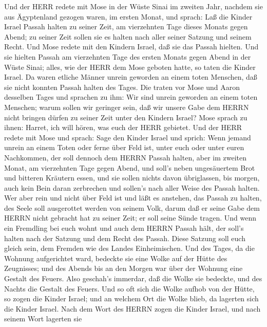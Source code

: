  Und der HERR redete mit Mose in der Wüste Sinai im zweiten
Jahr, nachdem sie aus Ägyptenland gezogen waren, im ersten Monat, und
sprach:  Laß die Kinder Israel Passah halten zu seiner Zeit,
 am vierzehnten Tage dieses Monats gegen Abend; zu seiner
Zeit sollen sie es halten nach aller seiner Satzung und seinem Recht.
 Und Mose redete mit den Kindern Israel, daß sie das Passah
hielten.  Und sie hielten Passah am vierzehnten Tage des
ersten Monats gegen Abend in der Wüste Sinai; alles, wie der HERR dem
Mose geboten hatte, so taten die Kinder Israel.  Da waren
etliche Männer unrein geworden an einem toten Menschen, daß sie nicht
konnten Passah halten des Tages. Die traten vor Mose und Aaron desselben
Tages  und sprachen zu ihm: Wir sind unrein geworden an
einem toten Menschen; warum sollen wir geringer sein, daß wir unsere
Gabe dem HERRN nicht bringen dürfen zu seiner Zeit unter den Kindern
Israel?  Mose sprach zu ihnen: Harret, ich will hören, was
euch der HERR gebietet.  Und der HERR redete mit Mose und
sprach:  Sage den Kinder Israel und sprich: Wenn jemand
unrein an einem Toten oder ferne über Feld ist, unter euch oder unter
euren Nachkommen, der soll dennoch dem HERRN Passah halten,
 aber im zweiten Monat, am vierzehnten Tage gegen Abend,
und soll's neben ungesäuertem Brot und bitteren Kräutern essen,
 und sie sollen nichts davon übriglassen, bis morgen, auch
kein Bein daran zerbrechen und sollen's nach aller Weise des Passah
halten.  Wer aber rein und nicht über Feld ist und läßt es
anstehen, das Passah zu halten, des Seele soll ausgerottet werden von
seinem Volk, darum daß er seine Gabe dem HERRN nicht gebracht hat zu
seiner Zeit; er soll seine Sünde tragen.  Und wenn ein
Fremdling bei euch wohnt und auch dem HERRN Passah hält, der soll's
halten nach der Satzung und dem Recht des Passah. Diese Satzung soll
euch gleich sein, dem Fremden wie des Landes Einheimischen.
 Und des Tages, da die Wohnung aufgerichtet ward, bedeckte
sie eine Wolke auf der Hütte des Zeugnisses; und des Abends bis an den
Morgen war über der Wohnung eine Gestalt des Feuers.  Also
geschah's immerdar, daß die Wolke sie bedeckte, und des Nachts die
Gestalt des Feuers.  Und so oft sich die Wolke aufhob von
der Hütte, so zogen die Kinder Israel; und an welchem Ort die Wolke
blieb, da lagerten sich die Kinder Israel.  Nach dem Wort
des HERRN zogen die Kinder Israel, und nach seinem Wort lagerten sie
